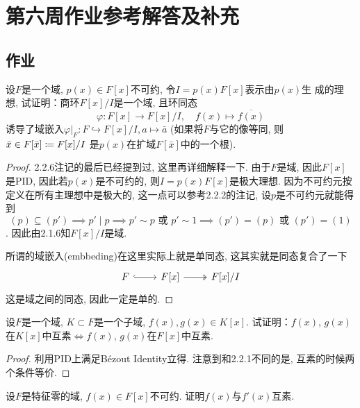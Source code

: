 \documentclass{../solutions-cn}
\begin{document}
\section*{第六周作业参考解答及补充}

\subsection*{作业}

\begin{exercise}[习题2.3.2]
    设$F$是一个域, $p(x) \in F[x]$不可约, 令$I = p(x)F[x]$表示由$p(x)$生
成的理想, 试证明：商环$F[x]/I$是一个域, 且环同态
\[
    \varphi:F[x] \to F[x]/I,\quad f(x) \mapsto \overline{f(x)}
\]
诱导了域嵌入$\varphi|_F: F\hookrightarrow F[x]/I, a \mapsto \bar{a}$
(如果将$F$与它的像等同, 则$\bar{x} \in F[\bar{x}] \mathrel{\coloneqq} F[x]/I$
是$p(x)$在扩域$F[\bar{x}]$中的一个根).
\end{exercise}

\begin{proof}
    2.2.6注记的最后已经提到过, 这里再详细解释一下. 由于$F$是域, 因此$F[x]$是PID, 因此若$p(x)$是不可约的, 则$I = p(x)F[x]$是极大理想. 因为不可约元按定义在所有主理想中是极大的, 这一点可以参考2.2.2的注记, 设$p$是不可约元就能得到
    \[
        (p) \subseteq (p') \implies p' \mid p \implies p' \sim p \text{ 或 } p' \sim 1 \implies (p') = (p) \text{ 或 } (p') = (1)
    \]. 因此由2.1.6知$F[x]/I$是域.
    
    所谓的域嵌入(embbeding)在这里实际上就是单同态, 这其实就是同态复合了一下
    \[
        \begin{tikzcd}
            F \arrow[r, hook] & {F[x]} \arrow[r, two heads] & {F[x]/I}
        \end{tikzcd}
    \]
    这是域之间的同态, 因此一定是单的.
\end{proof}

\begin{exercise}[习题2.3.3]
    设$F$是一个域, $K \subset F$是一个子域, $f(x), g(x) \in K[x]$.
试证明：$f(x)$, $g(x)$在$K[x]$中互素$\Leftrightarrow f(x)$,
$g(x)$在$F[x]$中互素.
\end{exercise}

\begin{proof}
    利用PID上满足Bézout Identity立得. 注意到和2.2.1不同的是, 互素的时候两个条件等价.
\end{proof}

\begin{exercise}[习题2.3.4]
    设$F$是特征零的域, $f(x) \in F[x]$不可约. 证明$f(x)$与$f'(x)$互素.
\end{exercise}
\end{document}
